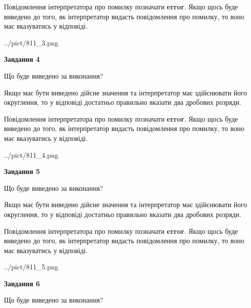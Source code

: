 \documentclass[12pt, ukrainian]{article}
\begin{document}
{\begin {Large}
Повідомлення інтерпретатора про помилку позначати \textbf{error}.
Якщо щось буде виведено до того, як інтерпретатор видасть повідомлення про помилку, 
то воно має вказуватись у відповіді. \par

\begin{center}
	{../pict/811_3.png}
\end{center}
\newpage

{\begin {center}\textbf{Завдання 4}\end {center}}\par
Що буде виведено за виконання? \par

Якщо має бути виведено дійсне значення та інтерпретатор має здійснювати його округлення, 
то у відповіді достатньо правильно вказати два дробових розряди.

Повідомлення інтерпретатора про помилку позначати \textbf{error}.
Якщо щось буде виведено до того, як інтерпретатор видасть повідомлення про помилку, 
то воно має вказуватись у відповіді. \par

\begin{center}
	{../pict/811_4.png}
\end{center}
\newpage

{\begin {center}\textbf{Завдання 5}\end {center}}\par
Що буде виведено за виконання? \par

Якщо має бути виведено дійсне значення та інтерпретатор має здійснювати його округлення, 
то у відповіді достатньо правильно вказати два дробових розряди.

Повідомлення інтерпретатора про помилку позначати \textbf{error}.
Якщо щось буде виведено до того, як інтерпретатор видасть повідомлення про помилку, 
то воно має вказуватись у відповіді. \par

\begin{center}
	{../pict/811_5.png}
\end{center}
\newpage

{\begin {center}\textbf{Завдання 6}\end {center}}\par
Що буде виведено за виконання? \par


\end{Large}}
\end{document}
